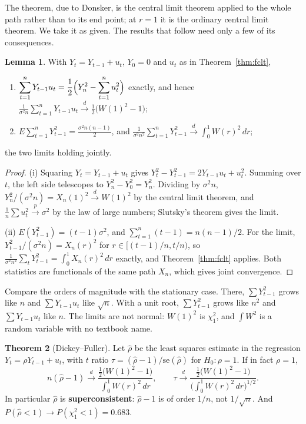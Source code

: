 \documentclass[11pt,a4paper]{article}
\numberwithin{equation}{section}
\theoremstyle{definition}
\newtheorem{thm}{Theorem}[subsection]
\newtheorem{lem}[thm]{Lemma}
\begin{document}
The theorem, due to Donsker, is the central limit theorem applied to the whole path rather than to its end point; at $r = 1$ it is the ordinary
central limit theorem. We take it as given. The results that follow need only a few of its consequences.

\begin{lem}
\label{lem:urmoments}
With $Y_t = Y_{t-1} + u_t$, $Y_0 = 0$ and $u_t$ as in Theorem~\ref{thm:fclt},
\begin{enumerate}[label=(\roman*)]
\item $\displaystyle\sum_{t=1}^nY_{t-1}u_t = \frac12\Bigl(Y_n^2 - \sum_{t=1}^nu_t^2\Bigr)$ exactly, and hence $\displaystyle\frac{1}{\sigma^2n}\sum_{t=1}^nY_{t-1}u_t \xrightarrow{d} \frac12\bigl(W(1)^2 - 1\bigr)$;
\item $\displaystyle E\sum_{t=1}^nY_{t-1}^2 = \frac{\sigma^2n(n - 1)}{2}$, and $\displaystyle\frac{1}{\sigma^2n^2}\sum_{t=1}^nY_{t-1}^2 \xrightarrow{d} \int_0^1W(r)^2\,dr$;
\end{enumerate}
the two limits holding jointly.
\end{lem}

\begin{proof}
(i) Squaring $Y_t = Y_{t-1} + u_t$ gives $Y_t^2 - Y_{t-1}^2 = 2Y_{t-1}u_t + u_t^2$. Summing over $t$, the left side telescopes to $Y_n^2 - Y_0^2 = Y_n^2$. Dividing by $\sigma^2n$,
$Y_n^2/(\sigma^2n) = X_n(1)^2 \xrightarrow{d} W(1)^2$ by the central limit theorem, and $\frac1n\sum u_t^2 \xrightarrow{p} \sigma^2$ by the law of large numbers; Slutsky's theorem gives the limit.

(ii) $E(Y_{t-1}^2) = (t - 1)\sigma^2$, and $\sum_{t=1}^n(t - 1) = n(n - 1)/2$. For the limit, $Y_{t-1}^2/(\sigma^2n) = X_n(r)^2$ for $r \in [(t - 1)/n, t/n)$, so
$\frac{1}{\sigma^2n^2}\sum_tY_{t-1}^2 = \int_0^1X_n(r)^2\,dr$ exactly, and Theorem~\ref{thm:fclt} applies. Both statistics are functionals of the same path $X_n$, which gives joint
convergence.
\end{proof}

Compare the orders of magnitude with the stationary case. There, $\sum Y_{t-1}^2$ grows like $n$ and $\sum Y_{t-1}u_t$ like $\sqrt n$. With a unit root, $\sum Y_{t-1}^2$
grows like $n^2$ and $\sum Y_{t-1}u_t$ like $n$. The limits are not normal: $W(1)^2$ is $\chi^2_1$, and $\int W^2$ is a random variable with no textbook name.

\begin{thm}[Dickey--Fuller]
\label{thm:df}
Let $\hat\rho$ be the least squares estimate in the regression $Y_t = \rho Y_{t-1} + u_t$, with $t$ ratio $\tau = (\hat\rho - 1)/\text{se}(\hat\rho)$ for $H_0\colon\rho = 1$. If in fact $\rho = 1$,
\[
n(\hat\rho - 1) \xrightarrow{d} \frac{\frac12\bigl(W(1)^2 - 1\bigr)}{\int_0^1W(r)^2\,dr}, \qquad
\tau \xrightarrow{d} \frac{\frac12\bigl(W(1)^2 - 1\bigr)}{\bigl(\int_0^1W(r)^2\,dr\bigr)^{1/2}} .
\]
In particular $\hat\rho$ is \textbf{superconsistent}: $\hat\rho - 1$ is of order $1/n$, not $1/\sqrt n$. And $P(\hat\rho < 1) \to P(\chi^2_1 < 1) = 0.683$.
\end{thm}
\end{document}
